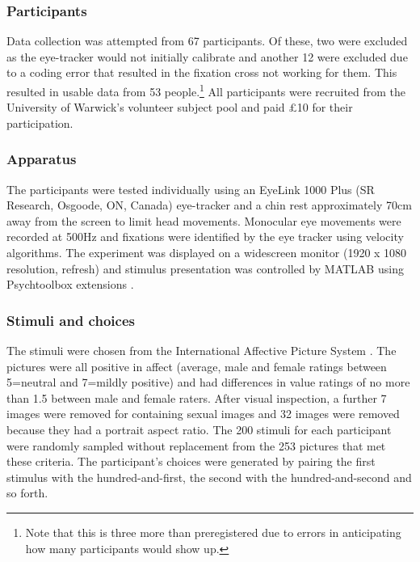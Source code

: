 \documentclass[doc, a4paper, apacite]{apa6}
\begin{document}
\subsubsection{Participants}
Data collection was attempted from 67 participants. Of these, two were excluded as the eye-tracker would not initially calibrate and another 12 were excluded due to a coding error that resulted in the fixation cross not working for them. This resulted in usable data from 53 people.\footnote{Note that this is three more than preregistered due to errors in anticipating how many participants would show up.} All participants were recruited from the University of Warwick's volunteer subject pool and paid \pounds10 for their participation.

\subsubsection{Apparatus}
The participants were tested individually using an EyeLink 1000 Plus (SR Research, Osgoode, ON, Canada) eye-tracker and a chin rest approximately 70cm away from the screen to limit head movements. Monocular eye movements were recorded at 500Hz and fixations were identified by the eye tracker using velocity algorithms. The experiment was displayed on a widescreen monitor (1920 x 1080 resolution, refresh) and stimulus presentation was controlled by MATLAB using Psychtoolbox extensions \cite{Brainard1997, Pelli1997}.

\subsubsection{Stimuli and choices}
The stimuli were chosen from the International Affective Picture System \cite{Lang:2008}. The pictures were all positive in affect (average, male and female ratings between 5=neutral and 7=mildly positive) and had differences in value ratings of no more than 1.5 between male and female raters. After visual inspection, a further 7 images were removed for containing sexual images and 32 images were removed because they had a portrait aspect ratio. The 200 stimuli for each participant were randomly sampled without replacement from the 253 pictures that met these criteria. The participant's choices were generated by pairing the first stimulus with the hundred-and-first, the second with the hundred-and-second and so forth. 
\end{document}
